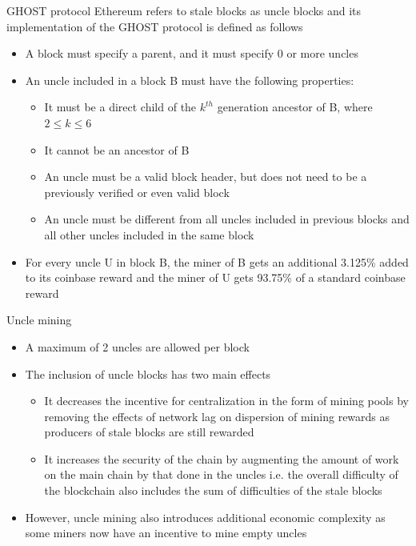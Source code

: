 \documentclass[9pt]{beamer}
\begin{document}
\begin{frame}{GHOST protocol}
	Ethereum refers to stale blocks as uncle blocks and its implementation of the GHOST protocol is defined as follows
	\begin{itemize}
		\item A block must specify a parent, and it must specify 0 or more uncles
		\item An uncle included in a block B must have the following properties:
		\begin{itemize}
			\item It must be a direct child of the $k^{th}$ generation ancestor of B, where $2 \leq k \leq 6$
			\item It cannot be an ancestor of B
			\item An uncle must be a valid block header, but does not need to be a previously verified or even valid block
			\item An uncle must be different from all uncles included in previous blocks and all other uncles included in the same block
		\end{itemize}
		\item For every uncle U in block B, the miner of B gets an additional 3.125\% added to its coinbase reward and the miner of U gets 93.75\% of a standard coinbase reward
	\end{itemize}
\end{frame}


\begin{frame}{Uncle mining}
	\begin{itemize}
		\item A maximum of 2 uncles are allowed per block
		\item The inclusion of uncle blocks has two main effects
		\begin{itemize}
			\item It decreases the incentive for centralization in the form of mining pools by removing the effects of network lag on dispersion of mining rewards as producers of stale blocks are still rewarded
			\item It increases the security of the chain by augmenting the amount of work on the main chain by that done in the uncles i.e. the overall difficulty of the blockchain also includes the sum of difficulties of the stale blocks
		\end{itemize}
		\item However, uncle mining also introduces additional economic complexity as some miners now have an incentive to mine empty uncles
	\end{itemize}
\end{frame}
\end{document}
